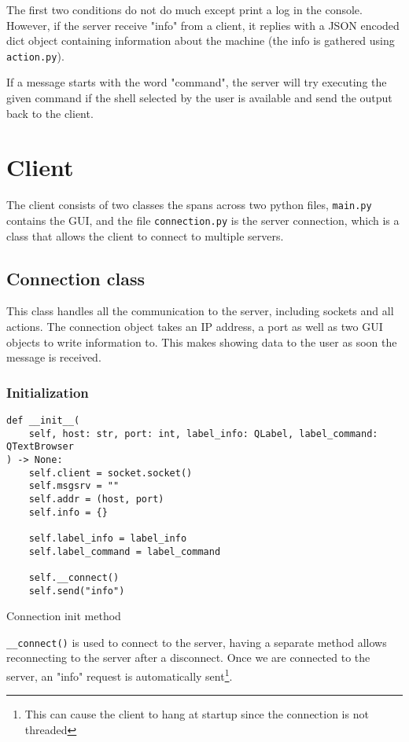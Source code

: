 \documentclass{article}
\begin{document}
The first two conditions do not do much except print a log in the console.
However, if the server receive "info" from a client, it replies with a JSON
encoded dict object containing information about the machine (the info is
gathered using \verb|action.py|). 

If a message starts with the word "command", the server will try executing the
given command if the shell selected by the user is available and send the output
back to the client.
\section{Client}
The client consists of two classes the spans across two python files,
\verb|main.py| contains the GUI, and the file \verb |connection.py| is the
server connection, which is a class that allows the client to connect to
multiple servers.

\subsection{Connection class}
This class handles all the communication to the server, including sockets and
all actions. The connection object takes an IP address, a port as well as two
GUI objects to write information to. This makes showing data to the user as soon
the message is received.

\subsubsection{Initialization}
\begin{listing}[H]
    \begin{verbatim}
def __init__(
    self, host: str, port: int, label_info: QLabel, label_command: QTextBrowser
) -> None:
    self.client = socket.socket()
    self.msgsrv = ""
    self.addr = (host, port)
    self.info = {}

    self.label_info = label_info
    self.label_command = label_command

    self.__connect()
    self.send("info")
    \end{verbatim}
    \caption{Connection init method}
    \label{client:init}
\end{listing}

\verb|__connect()| is used to connect to the server, having a separate
method allows reconnecting to the server after a disconnect. Once we are
connected to the server, an "info" request is automatically sent\footnote{This
can cause the client to hang at startup since the connection is not threaded}. 
\end{document}
